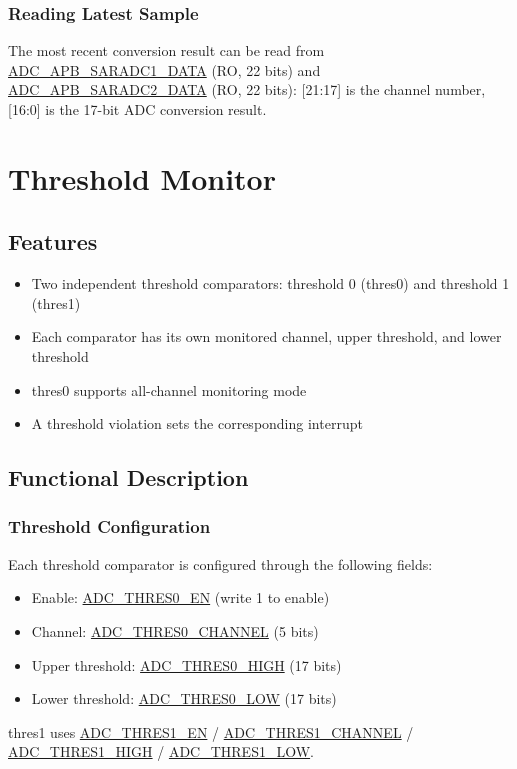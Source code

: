 \documentclass[main\_\_EN.tex]{subfiles}
\begin{document}
\subsubsection{Reading Latest Sample}
The most recent conversion result can be read from \hyperref[fielddesc:ADCAPBSARADC1DATA]{ADC\_APB\_SARADC1\_DATA} (RO, 22 bits) and \hyperref[fielddesc:ADCAPBSARADC2DATA]{ADC\_APB\_SARADC2\_DATA} (RO, 22 bits): [21:17] is the channel number, [16:0] is the 17-bit ADC conversion result. 


\section{Threshold Monitor}
\label{sec:adc-thres}

\subsection{Features}
\begin{itemize}
    \item Two independent threshold comparators: threshold 0 (thres0) and threshold 1 (thres1)
    \item Each comparator has its own monitored channel, upper threshold, and lower threshold
    \item thres0 supports all-channel monitoring mode
    \item A threshold violation sets the corresponding interrupt
\end{itemize}

\subsection{Functional Description}
\label{sec:adc-thres-func-descr}

\subsubsection{Threshold Configuration}
Each threshold comparator is configured through the following fields:
\begin{itemize}
    \item Enable: \hyperref[fielddesc:ADCTHRES0EN]{ADC\_THRES0\_EN} (write 1 to enable)
    \item Channel: \hyperref[fielddesc:ADCTHRES0CHANNEL]{ADC\_THRES0\_CHANNEL} (5 bits)
    \item Upper threshold: \hyperref[fielddesc:ADCTHRES0HIGH]{ADC\_THRES0\_HIGH} (17 bits)
    \item Lower threshold: \hyperref[fielddesc:ADCTHRES0LOW]{ADC\_THRES0\_LOW} (17 bits)
\end{itemize}
thres1 uses \hyperref[fielddesc:ADCTHRES1EN]{ADC\_THRES1\_EN} / \hyperref[fielddesc:ADCTHRES1CHANNEL]{ADC\_THRES1\_CHANNEL} / \hyperref[fielddesc:ADCTHRES1HIGH]{ADC\_THRES1\_HIGH} / \hyperref[fielddesc:ADCTHRES1LOW]{ADC\_THRES1\_LOW}.
\end{document}
